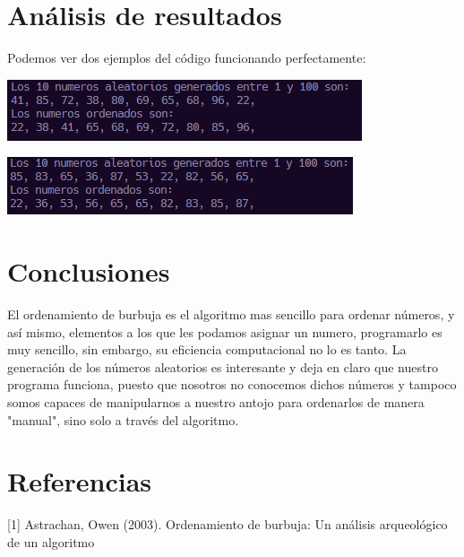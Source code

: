 \documentclass{article}
\begin{document}
	
	\newpage
	
	\begin{multicols}{2}
		
		\section{Análisis  de resultados}
		Podemos ver dos ejemplos del código funcionando perfectamente:
		\begin{center}
			\includegraphics[scale=0.8]{1.png} \\
		\end{center}
		\begin{center}	
			\includegraphics[scale=0.82]{2.png}
		\end{center}
		
		\section{Conclusiones}
		El ordenamiento de burbuja es el algoritmo mas sencillo para ordenar números, y así mismo, elementos a los que les podamos asignar un numero, programarlo es muy sencillo, sin embargo, su eficiencia computacional no lo es tanto.
		La generación de los números aleatorios es interesante y deja en claro que nuestro programa funciona, puesto que nosotros no conocemos dichos números y tampoco somos capaces de manipularnos a nuestro antojo para ordenarlos de manera "manual", sino solo a través del algoritmo.
		
		\section{Referencias }
		[1] Astrachan, Owen (2003). Ordenamiento de burbuja: Un análisis arqueológico de un algoritmo
	\end{multicols}
	
	
\end{document}

